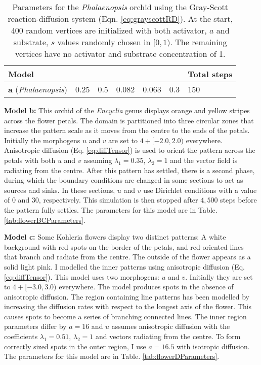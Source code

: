 \begin{table}[ht]
	\centering
	\begin{tabular}{lllllll}
	\hline
	\textbf{Model} & \bm{$D_a$} &\bm{$D_s$} &\bm{$F$} &\bm{$k$} &\bm{$dt$} & \textbf{Total steps} \\ \hline 
	\textbf{a} (\textit{Phalaenopsis})& 0.25& 0.5 &0.082 &0.063 &0.3 &150                \\ \hline
	\end{tabular}
	\caption[Parameters for the \textit{Phalaenopsis} orchid using the Gray-Scott reaction-diffusion system]{Parameters for the \textit{Phalaenopsis} orchid using the Gray-Scott reaction-diffusion system (Eqn. \ref{eq:grayscottRD}). At the start, 400 random vertices are initialized with both activator, $a$ and substrate, $s$ values randomly chosen in $[0, 1)$. The remaining vertices have no activator and substrate concentration of 1.}
	\label{tab:flowerAParameters}
\end{table}

\textbf{Model b:}
This orchid of the \textit{Encyclia} genus displays orange and yellow stripes across the flower petals. The domain is partitioned into three circular zones that increase the pattern scale as it moves from the centre to the ends of the petals. Initially the morphogens $u$ and $v$ are set to $4 + [-2.0, 2.0)$ everywhere. Anisotropic diffusion (Eq. \ref{eq:diffTensor}) is used to orient the pattern across the petals with both $u$ and $v$ assuming $\lambda_1=0.35$, $\lambda_2=1$ and the vector field is radiating from the centre. After this pattern has settled, there is a second phase, during which the boundary conditions are changed in some sections to act as sources and sinks. In these sections, $u$ and $v$ use Dirichlet conditions with a value of $0$ and $30$, respectively. This simulation is then stopped after $4,500$ steps before the pattern fully settles. The parameters for this model are in Table. \ref{tab:flowerBCParameters}.

\textbf{Model c:}
Some Kohleria flowers display two distinct patterns: A white background with red spots on the border of the petals, and red oriented lines that branch and radiate from the centre. The outside of the flower appears as a solid light pink. I modelled the inner patterns using anisotropic diffusion (Eq. \ref{eq:diffTensor}). This model uses two morphogens: $u$ and $v$. Initially they are set to $4 + [-3.0, 3.0)$ everywhere. The model produces spots in the absence of anisotropic diffusion. The region containing line patterns has been modelled by increasing the diffusion rates with respect to the longest axis of the flower. This causes spots to become a series of branching connected lines. The inner region parameters differ by $a=16$ and $u$  assumes anisotropic diffusion with the coefficients $\lambda_{1}=0.51$, $\lambda_{2}=1$ and vectors radiating from the centre. To form correctly sized spots in the outer region, I use $a=16.5$ with isotropic diffusion. The parameters for this model are in Table. \ref{tab:flowerDParameters}.

